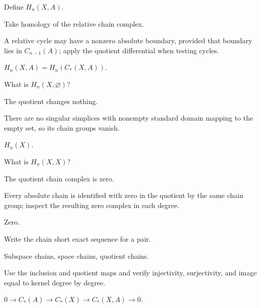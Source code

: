 \begin{exercise}\label{exr:viii19-03}
Define \(H_n(X,A)\).
\end{exercise}
\begin{hint}
Take homology of the relative chain complex.

A relative cycle may have a nonzero absolute boundary, provided that boundary lies in \(C_{n-1}(A)\); apply the quotient differential when testing cycles.
\end{hint}
\begin{solution}
\(H_n(X,A)=H_n(C_*(X,A))\).
\end{solution}

\begin{exercise}\label{exr:viii19-04}
What is \(H_n(X,\varnothing)\)?
\end{exercise}
\begin{hint}
The quotient changes nothing.

There are no singular simplices with nonempty standard domain mapping to the empty set, so its chain groups vanish.
\end{hint}
\begin{solution}
\(H_n(X)\).
\end{solution}

\begin{exercise}\label{exr:viii19-05}
What is \(H_n(X,X)\)?
\end{exercise}
\begin{hint}
The quotient chain complex is zero.

Every absolute chain is identified with zero in the quotient by the same chain group; inspect the resulting zero complex in each degree.
\end{hint}
\begin{solution}
Zero.
\end{solution}

\begin{exercise}\label{exr:viii19-06}
Write the chain short exact sequence for a pair.
\end{exercise}
\begin{hint}
Subspace chains, space chains, quotient chains.

Use the inclusion and quotient maps and verify injectivity, surjectivity, and image equal to kernel degree by degree.
\end{hint}
\begin{solution}
\(0\to C_*(A)\to C_*(X)\to C_*(X,A)\to0\).
\end{solution}

